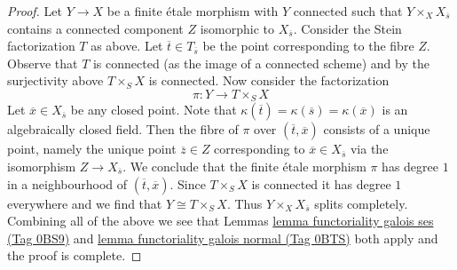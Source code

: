 \documentclass{amsart}
\theoremstyle{plain}
\theoremstyle{definition}
\theoremstyle{remark}
\numberwithin{equation}{subsection}
\begin{document}
\begin{proof}
\medskip\noindent
Let $Y \to X$ be a finite \'etale morphism with $Y$ connected such that
$Y \times_X X_{\overline{s}}$ contains a connected component $Z$
isomorphic to $X_{\overline{s}}$. Consider the Stein factorization $T$
as above. Let $\overline{t} \in T_{\overline{s}}$ be the point corresponding
to the fibre $Z$. Observe that $T$ is connected (as the image of a connected
scheme) and by the surjectivity above $T \times_S X$ is connected.
Now consider the factorization
$$
\pi : Y \longrightarrow T \times_S X
$$
Let $\overline{x} \in X_{\overline{s}}$ be any closed point. Note that
$\kappa(\overline{t}) = \kappa(\overline{s}) = \kappa(\overline{x})$
is an algebraically closed field.
Then the fibre of $\pi$ over $(\overline{t}, \overline{x})$ consists
of a unique point, namely the unique point $\overline{z} \in Z$
corresponding to $\overline{x} \in X_{\overline{s}}$ via the
isomorphism $Z \to X_{\overline{s}}$. We conclude that the finite
\'etale morphism $\pi$ has degree $1$ in a neighbourhood of
$(\overline{t}, \overline{x})$. Since $T \times_S X$ is connected
it has degree $1$ everywhere and we find that $Y \cong T \times_S X$.
Thus $Y \times_X X_{\overline{s}}$ splits completely.
Combining all of the above we see that
Lemmas \href{https://stacks.math.columbia.edu/tag/0BS9}{lemma functoriality galois ses (Tag 0BS9)} and
\href{https://stacks.math.columbia.edu/tag/0BTS}{lemma functoriality galois normal (Tag 0BTS)}
both apply and the proof is complete.
\end{proof}
\end{document}
